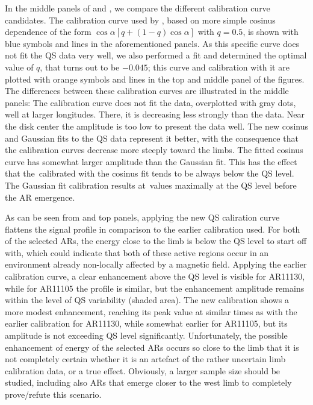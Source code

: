 \documentclass{aa}
\begin{document}
In the middle panels of  and , we compare the different calibration curve candidates.
The calibration curve used by 
\cite{SRB16},
based on more simple cosinus dependence of the form $\cos{\alpha} \left[q + \left(1-q \right) \cos{\alpha} \right]$ with $q=0.5$, is shown with blue symbols and lines in the aforementioned panels.
As this specific curve does not fit the QS data very well, we also performed a fit and determined the optimal value of $q$, that turns out to be $-0.045$; this curve and calibration with it are plotted with orange symbols and lines in the top and middle panel of the figures.
The differences between these calibration curves are illustrated in the middle panels: The \cite{SRB16} calibration
curve does not fit the data, overplotted with gray dots, well at larger longitudes. There, it 
is decreasing less strongly than the data. Near the disk center the amplitude is too low to present the data well.
The new cosinus and Gaussian fits to the QS
data represent it better, with the consequence that the calibration curves decrease more steeply toward the limbs.
The fitted cosinus curve has somewhat larger amplitude than the Gaussian fit. This has the effect that the \eft\,calibrated
with the cosinus fit tends to be always below the QS level. The Gaussian fit calibration results at \eft\,values maximally at the QS level before the AR emergence.

As can be seen
from  and  top panels, 
applying the new QS caliration curve flattens the signal profile in comparison to the
earlier calibration used. For both of the selected ARs, the \fff energy close to the limb is below the QS level to start off with, which could indicate that both of these active regions occur in an environment 
already non-locally affected by a magnetic field. 
Applying the earlier calibration curve, a clear enhancement above the QS level is visible for AR11130, while for AR11105 the profile is similar, but the enhancement amplitude remains within the level of QS variability (shaded area). The new calibration shows a more modest enhancement, reaching its peak value at similar times as with the earlier calibration for AR11130, while somewhat earlier for AR11105, but its amplitude is not exceeding QS level significantly. Unfortunately, the possible enhancement of \fff energy of the selected ARs occurs so close to the limb that it is not completely certain whether it is an artefact of the rather uncertain limb calibration data, or a true effect. Obviously, a larger sample size should be studied, including also ARs that emerge closer to the west limb to completely prove/refute this scenario.  
\end{document}

